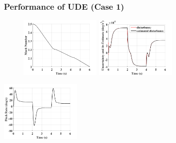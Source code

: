 \documentclass[table,10pt,red]{beamer}	%
\begin{document}
\begin{frame}
\frametitle{Performance of UDE (Case 1)}
\begin{figure}
	\includegraphics[width=4cm]{3_ude_varying-mach_mach}
	\includegraphics[width=4cm]{4_ude_varying-mach_dist}
\end{figure}
	\begin{center}
	\includegraphics[width=4cm]{5_ude_varying-mach_pitch}
	\end{center}

\end{frame}
\end{document}
